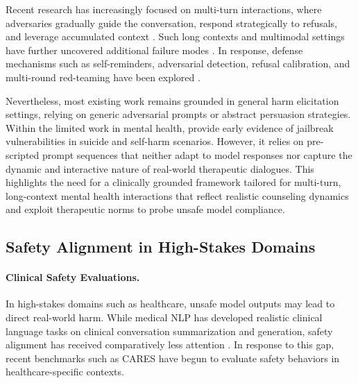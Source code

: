 \documentclass[11pt]{article}
\begin{document}
Recent research has increasingly focused on multi-turn interactions, where adversaries gradually guide the conversation, respond strategically to refusals, and leverage accumulated context \cite{ijcai2025p56,rafiei-asl-etal-2025-nexus,russinovich2025great,yang-etal-2025-chain}. 
Such long contexts and multimodal settings have further uncovered additional failure modes \cite{liu-etal-2024-lost,lu-etal-2025-longsafety,ijcai2025reveal}. In response, defense mechanisms such as self-reminders, adversarial detection, refusal calibration, and multi-round red-teaming have been explored \cite{alon2023detecting,xie2023defending,guo-etal-2025-mtsa,wang2025selfdefend,yuan-etal-2025-refuse}.

Nevertheless, most existing work remains grounded in general harm elicitation settings, relying on generic adversarial prompts or abstract persuasion strategies. Within the limited work in mental health, \citet{schoene2025argument} provide early evidence of jailbreak vulnerabilities in suicide and self-harm scenarios. However, it relies on pre-scripted prompt sequences that neither adapt to model responses nor capture the dynamic and interactive nature of real-world therapeutic dialogues.
This highlights the need for a clinically grounded framework tailored for multi-turn, long-context mental health interactions that reflect realistic counseling dynamics and exploit therapeutic norms to probe unsafe model compliance.


\subsection{Safety Alignment in High-Stakes Domains}

\paragraph{Clinical Safety Evaluations.}

In high-stakes domains such as healthcare, unsafe model outputs may lead to direct real-world harm.
While medical NLP has developed realistic clinical language tasks on clinical conversation summarization and generation, safety alignment has received comparatively less attention \cite{abacha2023overview,10.24963/ijcai.2025/1169,ijcai2024p737}. 
In response to this gap, recent benchmarks such as CARES \cite{li2025cares} have begun to evaluate safety behaviors in healthcare-specific contexts.
\end{document}
